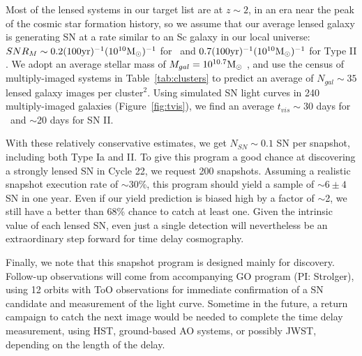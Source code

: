Most of the lensed systems in our target list are at $z\sim 2$, in an
era near the peak of the cosmic star formation history, so we assume
that our average lensed galaxy is generating SN at a rate similar to
an Sc galaxy in our local universe: $SNR_{M} \sim0.2
(100 \mbox{yr})^{-1} (10^{10} \mbox{M$_{\odot}$})^{-1}$ for \SNIa\ and $0.7
(100 \mbox{yr})^{-1} (10^{10} \mbox{M$_{\odot}$})^{-1}$ for Type
II \citep{Mannucci:2005}.  We adopt an average stellar mass of
$M_{gal}=10^{10.7} \mbox{M$_{\odot}$}$ \citep{Tomczak:2013}, and use the census of
multiply-imaged systems in Table~\ref{tab:clusters} to predict an
average of $N_{gal}\sim 35$ lensed galaxy images per
cluster$^{2}$.  Using simulated SN light curves in 240 multiply-imaged
galaxies (Figure~\ref{fig:tvis}), we find an average $t_{vis}\sim 30$
days for \SNIa\ and $\sim$20 days for SN II.


With these relatively conservative estimates, we get $N_{SN}\sim
0.1$ SN per snapshot, including both Type Ia and II.  To give this
program a good chance at discovering a strongly lensed SN in Cycle 22,
we request 200 snapshots.  Assuming a realistic snapshot execution
rate of $\sim$30\%, this program should yield a sample of $\sim 6 \pm
4$ SN in one year.  Even if our yield prediction is biased high by a
factor of $\sim$2, we still have a better than 68\% chance to catch at
least one.  Given the intrinsic value of each lensed SN, even just a
single detection will nevertheless be an extraordinary step forward
for time delay cosmography.

Finally, we note that this snapshot program is designed mainly for
discovery. Follow-up observations will come from accompanying GO
program (PI: Strolger), using 12 orbits with ToO observations for immediate
confirmation of a SN candidate and measurement of the light curve.
Sometime in the future, a return campaign to catch the next image
would be needed to complete the time delay measurement, using HST,
ground-based AO systems, or possibly JWST, depending on the length of
the delay.









